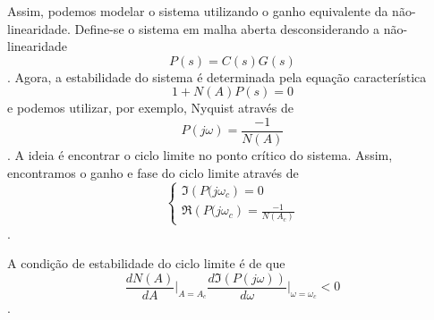 Assim, podemos modelar o sistema utilizando o ganho equivalente da não-linearidade. Define-se o sistema em malha aberta desconsiderando a não-linearidade \[
    P(s) = C(s)G(s)
\]. Agora, a estabilidade do sistema é determinada pela equação característica \[
1 + N(A)P(s) = 0
\] e podemos utilizar, por exemplo, Nyquist através de \[
P(j\omega) = \frac{-1}{N(A)}
\]. A ideia é encontrar o ciclo limite no ponto crítico do sistema. Assim, encontramos o ganho e fase do ciclo limite através de \[
\begin{cases}
    \Im\left( P(j\omega_c \right) = 0 \\
    \Re\left( P(j\omega_c \right) = \frac{-1}{N(A_c)}
\end{cases}
\].

A condição de estabilidade do ciclo limite é de que \[
    \frac{d N(A)}{dA}\Bigr|_{A=A_c} \frac{d \Im\left( P(j\omega) \right) }{d\omega}\Bigr|_{\omega=\omega_c} < 0
\].


